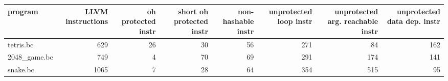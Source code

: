 \documentclass{article}
\begin{document}
\begin{table}[ht]
\centering
\begin{adjustbox}{width=1.3\textwidth}
\begin{tabular}{lrrrrrrr}
\hline
 program      &   LLVM instructions &   oh protected instr &   short oh protected instr &   non-hashable instr &   unprotected loop instr &   unprotected arg. reachable instr &   unprotected data dep. instr \\
\hline
 tetris.bc    &                 629 &                   26 &                         30 &                   56 &                      271 &                                 84 &                           162 \\
 2048\_game.bc &                 749 &                    4 &                         70 &                   69 &                      291 &                                174 &                           141 \\
 snake.bc     &                1065 &                    7 &                         28 &                   64 &                      354 &                                515 &                            95 \\
\hline
\end{tabular}

\end{adjustbox}
\end{table}
\end{document}
